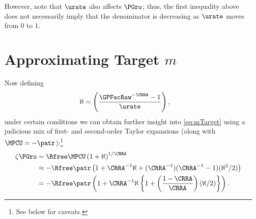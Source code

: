 \documentclass{\handout}
\begin{document}
However, note that $\urate$ also affects $\PGro$; thus, the first inequality above does
not necessarily imply that the denominator is decreasing as $\urate$ moves from $0$ to $1$.


\section{Approximating Target $m$}

Now defining
\begin{equation}\begin{gathered}\begin{aligned}
  \aleph & =  \left(\frac{\GPFacRaw^{-\CRRA} - 1}{\urate}\right),
\end{aligned}\end{gathered}\end{equation}
under certain conditions we can obtain further insight into \eqref{eq:mTarget} using a judicious mix of first- and second-order Taylor expansions (along with $\MPCU = -\patr$):\footnote{See below for caveats.}
\begin{equation}\begin{gathered}\begin{aligned}
  \label{eq:zetaExp}
  \zeta\PGro & =  \Rfree \MPCU \left(1+\aleph\right)^{1/\CRRA}
\\ & \approx  -\Rfree \patr \left(1+\CRRA^{-1}\aleph+(\CRRA^{-1})(\CRRA^{-1}-1)(\aleph^{2}/2)\right)
\\ & =  -\Rfree \patr \left(1+\CRRA^{-1}\aleph\left\{1+\left(\frac{1-\CRRA}{\CRRA}\right)(\aleph/2)\right\}\right) %
.
\end{aligned}\end{gathered}\end{equation}
\end{document}
